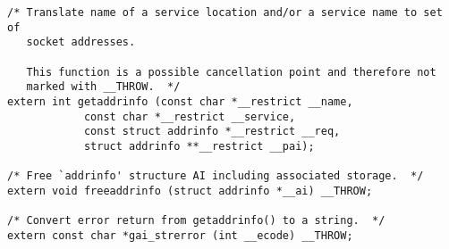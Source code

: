 \documentclass{article}
\begin{document}
\begin{lstlisting}
/* Translate name of a service location and/or a service name to set of
   socket addresses.

   This function is a possible cancellation point and therefore not
   marked with __THROW.  */
extern int getaddrinfo (const char *__restrict __name,
			const char *__restrict __service,
			const struct addrinfo *__restrict __req,
			struct addrinfo **__restrict __pai);

/* Free `addrinfo' structure AI including associated storage.  */
extern void freeaddrinfo (struct addrinfo *__ai) __THROW;

/* Convert error return from getaddrinfo() to a string.  */
extern const char *gai_strerror (int __ecode) __THROW;
\end{lstlisting}
\end{document}
